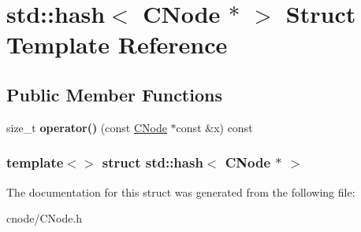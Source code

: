 \hypertarget{structstd_1_1hash_3_01CNode_01_5_01_4}{\section{std\-:\-:hash$<$ \-C\-Node $\ast$ $>$ \-Struct \-Template \-Reference}
\label{structstd_1_1hash_3_01CNode_01_5_01_4}
}
\subsection*{\-Public \-Member \-Functions}
\begin{DoxyCompactItemize}
\item 
\hypertarget{structstd_1_1hash_3_01CNode_01_5_01_4_ad1c3a9c242bf47254cb9718ceca6ef1a}{size\-\_\-t {\bfseries operator()} (const \hyperlink{classCNode}{\-C\-Node} $\ast$const \&x) const }\label{structstd_1_1hash_3_01CNode_01_5_01_4_ad1c3a9c242bf47254cb9718ceca6ef1a}

\end{DoxyCompactItemize}
\subsubsection*{template$<$$>$ struct std\-::hash$<$ C\-Node $\ast$ $>$}



\-The documentation for this struct was generated from the following file\-:\begin{DoxyCompactItemize}
\item 
cnode/\-C\-Node.\-h\end{DoxyCompactItemize}
